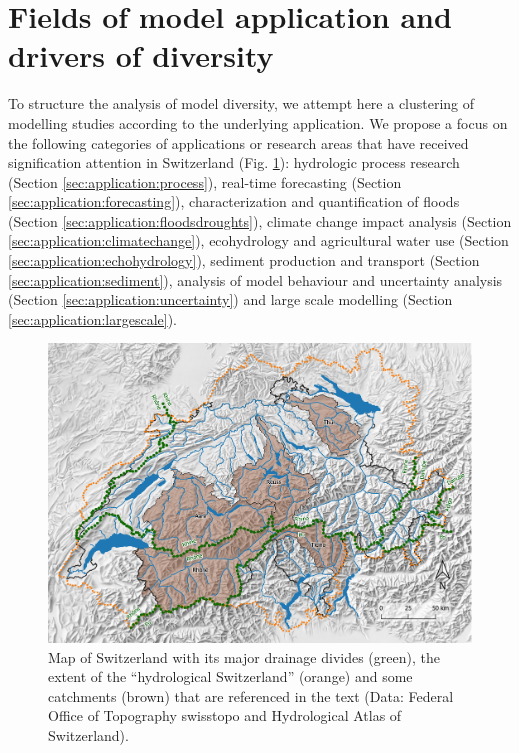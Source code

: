 \documentclass[10pt,a4paper]{article}
\begin{document}
\section{Fields of model application and drivers of diversity}
\label{sec:application}

To structure the analysis of model diversity, we attempt here a
clustering of modelling studies according to the underlying application.
We propose a focus on the following categories of applications or
research areas that have received signification attention in Switzerland
(Fig. \ref{fig:map}): hydrologic process research
(Section \ref{sec:application:process}), real-time forecasting 
(Section \ref{sec:application:forecasting}), characterization and 
quantification of floods (Section \ref{sec:application:floodsdroughts}), 
climate change impact analysis (Section \ref{sec:application:climatechange}), 
ecohydrology and agricultural water use (Section \ref{sec:application:echohydrology}),
sediment production and transport (Section \ref{sec:application:sediment}), analysis of model
behaviour and uncertainty analysis (Section \ref{sec:application:uncertainty}) and large scale
modelling (Section \ref{sec:application:largescale}).

\begin{figure}[htb]
	\begin{center}
		\includegraphics[width=0.95\columnwidth]{figures/Map}
		\caption{{Map of Switzerland with its major drainage divides (green), the extent
				of the ``hydrological Switzerland'' (orange) and some catchments (brown)
				that are referenced in the text (Data: Federal Office of Topography
				swisstopo and Hydrological Atlas of Switzerland). 
				\label{fig:map}
		}}
	\end{center}
\end{figure}
\end{document}
